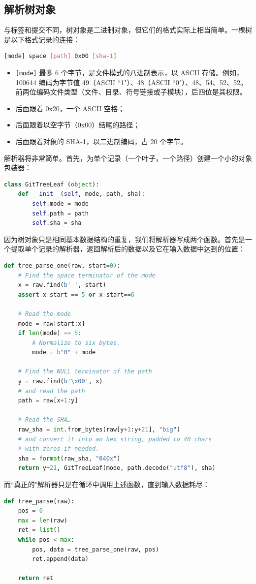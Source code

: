 \documentclass{ctexart}
\theoremstyle{remark}
\theoremstyle{warningstyle}
\theoremstyle{warningstyle}
\begin{document}
\subsection{解析树对象}
与标签和提交不同，树对象是二进制对象，但它们的格式实际上相当简单。一棵树是以下格式记录的连接：
\begin{lstlisting}[language=bash]
[mode] space [path] 0x00 [sha-1]
\end{lstlisting}
\begin{itemize}
    \item \lstinline|[mode]| 最多 6 个字节，是文件模式的八进制表示，以 ASCII 存储。例如，100644 编码为字节值 49（ASCII ``1"）、48（ASCII ``0"）、48、54、52、52。前两位编码文件类型（文件、目录、符号链接或子模块），后四位是其权限。
    \item 后面跟着 0x20，一个 ASCII 空格；
    \item 后面跟着以空字节（0x00）结尾的路径；
    \item 后面跟着对象的 SHA-1，以二进制编码，占 20 个字节。
\end{itemize}
解析器将非常简单。首先，为单个记录（一个叶子，一个路径）创建一个小的对象包装器：
\begin{lstlisting}[language=Python]
class GitTreeLeaf (object):
    def __init__(self, mode, path, sha):
        self.mode = mode
        self.path = path
        self.sha = sha
\end{lstlisting}
因为树对象只是相同基本数据结构的重复，我们将解析器写成两个函数。首先是一个提取单个记录的解析器，返回解析后的数据以及它在输入数据中达到的位置：
\begin{lstlisting}[language=Python]
def tree_parse_one(raw, start=0):
    # Find the space terminator of the mode
    x = raw.find(b' ', start)
    assert x-start == 5 or x-start==6

    # Read the mode
    mode = raw[start:x]
    if len(mode) == 5:
        # Normalize to six bytes.
        mode = b"0" + mode

    # Find the NULL terminator of the path
    y = raw.find(b'\x00', x)
    # and read the path
    path = raw[x+1:y]

    # Read the SHA…
    raw_sha = int.from_bytes(raw[y+1:y+21], "big")
    # and convert it into an hex string, padded to 40 chars
    # with zeros if needed.
    sha = format(raw_sha, "040x")
    return y+21, GitTreeLeaf(mode, path.decode("utf8"), sha)
\end{lstlisting}
而``真正的"解析器只是在循环中调用上述函数，直到输入数据耗尽：
\begin{lstlisting}[language=Python]
def tree_parse(raw):
    pos = 0
    max = len(raw)
    ret = list()
    while pos < max:
        pos, data = tree_parse_one(raw, pos)
        ret.append(data)

    return ret
\end{lstlisting}
\end{document}
